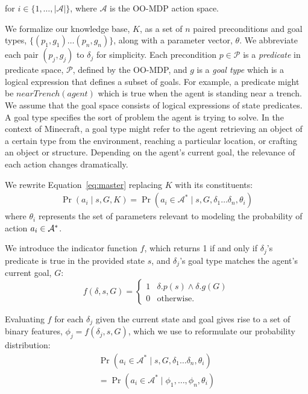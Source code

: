 \documentclass[letterpaper]{article}
\begin{document}
\noindent for $i \in \{1, \ldots, |\mathcal{A}|\}$, where $\mathcal{A}$ is the OO-MDP action space.

We formalize our knowledge base, $K$, as a set of $n$ paired
preconditions and goal types, $\{ (p_1, g_1) \ldots (p_{n}, g_{n})\}$,
along with a parameter vector, $\theta$. We abbreviate each pair
$(p_j, g_j)$ to $\delta_j$ for simplicity. Each precondition $p \in
\mathcal{P}$ is a {\it predicate} in predicate space, $\mathcal{P}$,
defined by the OO-MDP, and $g$ is a {\it goal type}
which is a logical expression that defines a subset of goals.  For example, a
predicate might be $nearTrench(agent)$ which is true when the agent is
standing near a trench. We assume that the goal space consists of
logical expressions of state predicates. A goal type specifies the
sort of problem the agent is trying to solve. In the context of
Minecraft, a goal type might refer to the agent retrieving an object
of a certain type from the environment, reaching a particular
location, or crafting an object or structure.  Depending on the
agent's current goal, the relevance of each action changes
dramatically.

We rewrite Equation~\ref{eq:master} replacing $K$ with its constituents:
\begin{multline}
\Pr(a_i \mid s, G, K)
= \Pr(a_i \in \mathcal{A}^* \mid s, G, \delta_1 \ldots \delta_n, \theta_i)
\end{multline}
\noindent where $\theta_i$ represents the set of parameters relevant to modeling
the probability of action $a_i \in {\cal A}^*$. 

We introduce the indicator function $f$, which returns 1 if and only if $\delta_j$'s predicate is true in the provided state $s$, and $\delta_j$'s goal type matches the agent's current goal, $G$:
\begin{equation}
f(\delta, s, G) = 
\begin{cases}
1& \delta.p(s) \wedge \delta.g(G) \\
0& \text{otherwise.}
\end{cases}
\label{eq:f_func_def}
\end{equation}

Evaluating $f$ for each $\delta_j$ given the current state and goal gives rise to a set of binary features,
$\phi_j = f(\delta_j, s, G)$, which we use to reformulate our probability distribution:
\begin{multline}
\Pr(a_i \in \mathcal{A}^*  \mid s, G, \delta_1 \ldots \delta_n, \theta_i) \\
= \Pr(a_i \in \mathcal{A}^*  \mid \phi_1, \ldots, \phi_n, \theta_i)
\label{eq:feature_rep}
\end{multline}
\end{document}
